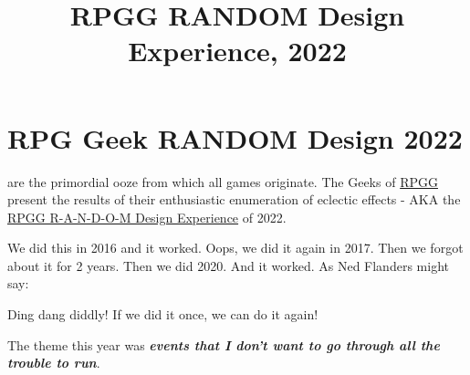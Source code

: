 

\title{RPGG RANDOM Design Experience, 2022}

\mainmatter
\chapter*{RPG Geek RANDOM Design 2022}
 are the primordial ooze from which all games
originate. The Geeks of
\href{https://rpggeek.com/}{RPGG}
present the results of their enthusiastic enumeration of eclectic effects - AKA
the
\href{https://rpggeek.com/thread/2942480/2022-r-n-d-o-m-design-experience}{RPGG
R-A-N-D-O-M Design Experience} of 2022.

We did this in 2016 and it worked. Oops, we did it again in 2017. Then we forgot
about it for 2 years. Then we did 2020. And it worked. As Ned Flanders
might say:
\begin{DndReadAloud}
Ding dang diddly! If we did it once, we can do it again!
\end{DndReadAloud}

The theme this year was \emph{\textbf{events that I don't want to go through all the
trouble to run}}.




